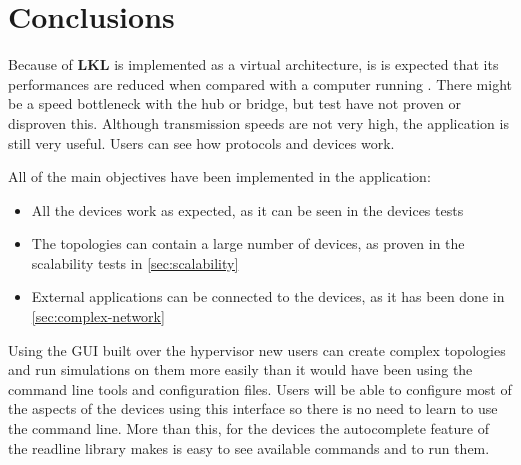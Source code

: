 \chapter{Conclusions}
\label{chapter:conclusions}

Because of \textbf{LKL} is implemented as a virtual architecture, is is expected
that its performances are reduced when compared with a computer running .
There might be a speed bottleneck with the hub or bridge, but test have not proven or disproven
this. Although transmission speeds are not very high, the application is still very useful. Users can
see how protocols and devices work.

All of the main objectives have been implemented in the application:
\begin{itemize}
	\item All the devices work as expected, as it can be seen in the devices tests
	\item The topologies can contain a large number of devices, as proven in the scalability tests in \ref{sec:scalability}
	\item External applications can be connected to the \textbf{\project} devices, as it has
been done in \ref{sec:complex-network}
\end{itemize}

Using the GUI built over the hypervisor new users can create complex topologies and run simulations
on them more easily than it would have been using the command line tools and configuration files. Users will be able to configure
most of the aspects of the devices using this interface so there is no need to learn to use the command line. More than
this, for the devices the autocomplete feature of the readline library makes is easy to see available commands and
to run them.
